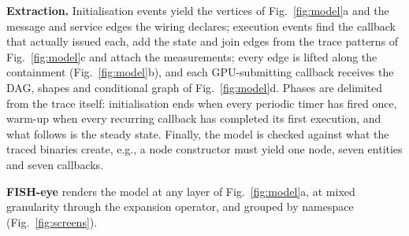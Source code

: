 \noindent\textbf{Extraction.} Initialisation events yield the vertices of Fig.~\ref{fig:model}a and the message and service edges the wiring declares; execution events find the callback that actually issued each, add the state and join edges from the trace patterns of Fig.~\ref{fig:model}c and attach the measurements; every edge is lifted along the containment (Fig.~\ref{fig:model}b), and each GPU-submitting callback receives the DAG, shapes and conditional graph of Fig.~\ref{fig:model}d. Phases are delimited from the trace itself: initialisation ends when every periodic timer has fired once, warm-up when every recurring callback has completed its first execution, and what follows is the steady state. Finally, the model is checked against what the traced binaries create, e.g., a node constructor must yield one node, seven entities and seven callbacks.

\noindent\textbf{FISH-eye} renders the model at any layer of Fig.~\ref{fig:model}a, at mixed granularity through the expansion operator, and grouped by namespace (Fig.~\ref{fig:screens}).
